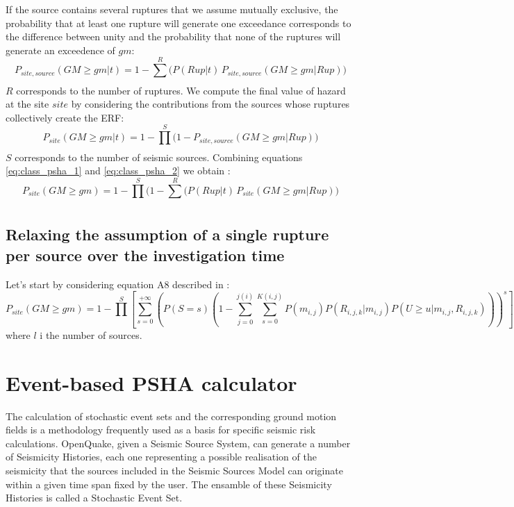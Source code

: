 %

%
If the source contains several ruptures that we assume mutually exclusive, 
the probability that at least one rupture will generate one exceedance 
corresponds to the difference between unity and the probability that none 
of the ruptures will generate an exceedence of $gm$:
\begin{equation}
P_{site,source}(GM\geq gm|t) = 1 - \sum_{}^{R} \Big( P(Rup|t)\,P_{site,source}(GM\geq gm|Rup) \Big)
\label{eq:class_psha_1}
\end{equation}
$R$ corresponds to the number of ruptures. We compute the final value of 
hazard at the site $site$ by considering the contributions from the sources
whose ruptures collectively create the ERF:
%
\begin{equation}
P_{site}(GM \geq gm|t) = 1 - \prod_{}^{S} \Big( 1-P_{site,source}(GM\geq gm|Rup) \Big)
\label{eq:class_psha_2}
\end{equation}
%
$S$ corresponds to the number of seismic sources. Combining equations 
\ref{eq:class_psha_1} and \ref{eq:class_psha_2} we obtain 
\cite[][equation 4, page 410]{field2003}:
%
\begin{equation}
P_{site}(GM\geq gm)=1-\prod\limits_{}^{S} 
	\Big( 
		1-\sum_{}^{R} \Big( P(Rup|t)\,P_{site}(GM\geq gm|Rup)
	\Big)
\label{eq:PSHA_calculation}
\end{equation}

\subsection{Relaxing the assumption of a single rupture per source over 
the investigation time}
%
Let's start by considering equation A8 described in \citet{field2003}:
%
\begin{equation}
P_{site}(GM\geq gm)= 
	1-\prod\limits_{}^{S} 
	\left[\sum\limits_{s=0}^{+\infty}
	\left(P(S=s) 
	\left(
		1-\sum\limits_{j=0}^{j(i)}\sum\limits_{s=0}^{K(i,j)} 
		P(m_{i,j}) 
		P(R_{i,j,k}|m_{i,j}) P(U\geq u|m_{i,j},R_{i,j,k})
	\right)
	\right)^{s}
	\right] 
\end{equation}
where $l$ i the number of sources.
%
\clearpage \newpage
\section{Event-based PSHA calculator}
\label{chap:stochastic_psha}
%
The calculation of stochastic event sets  and the 
corresponding ground motion fields is a methodology frequently used as a basis
for specific seismic risk calculations.
%
OpenQuake, given a Seismic Source System, can generate a number of Seismicity 
Histories, each one representing a possible realisation of the seismicity 
that the sources included in the Seismic Sources Model can originate within 
a given time span fixed by the user. The ensamble of these Seismicity Histories 
is called a Stochastic Event Set.

